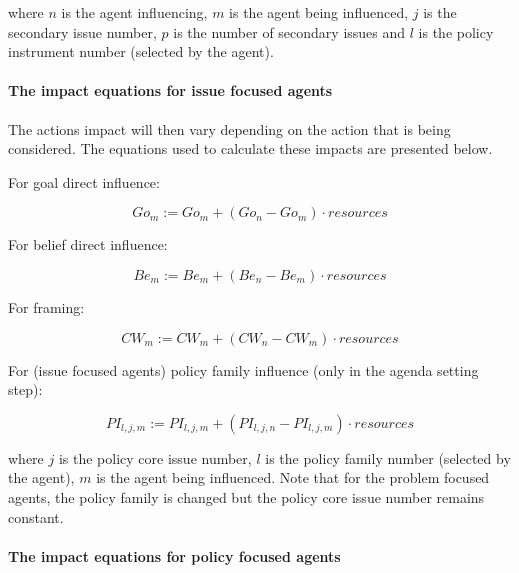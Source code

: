\documentclass[11pt]{article}
\begin{document}
where $n$ is the agent influencing, $m$ is the agent being influenced, $j$ is the secondary issue number, $p$ is the number of secondary issues and $l$ is the policy instrument number (selected by the agent).

\paragraph{The impact equations for issue focused agents}
\label{sssec:}

The actions impact will then vary depending on the action that is being considered. The equations used to calculate these impacts are presented below.

For goal direct influence:

\begin{equation}\label{eq:impactAimChange}
Go_{m} := Go_{m} + \left(Go_{n} - Go_{m} \right) \cdot resources
\end{equation}

For belief direct influence:

\begin{equation}\label{eq:impactStateChange}
Be_{m} := Be_{m} + \left(Be_{n} - Be_{m} \right) \cdot resources
\end{equation}

For framing:

\begin{equation}\label{eq:impactFraming}
CW_{m} := CW_{m} + \left(CW_{n} - CW_{m} \right) \cdot resources
\end{equation}

For (issue focused agents) policy family influence (only in the agenda setting step):

\begin{equation}\label{eq:impactPFChangeProblem}
PI_{l,j,m} := PI_{l,j,m} + \left(PI_{l,j,n} - PI_{l,j,m} \right) \cdot resources
\end{equation}

where $j$ is the policy core issue number, $l$ is the policy family number (selected by the agent), $m$ is the agent being influenced. Note that for the problem focused agents, the policy family is changed but the policy core issue number remains constant.

\paragraph{The impact equations for policy focused agents}
\label{sssec:}
\end{document}
